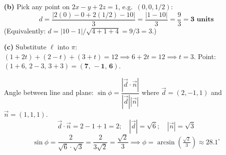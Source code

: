 \documentclass[addpoints]{exam}
\begin{document}
\begin{questions}
\begin{solution}[10cm]
\textbf{(b)} Pick any point on $2x-y+2z=1$, e.g.\ $(0,0,1/2)$:
\[
d = \frac{|2(0)-0+2(1/2)-10|}{3} = \frac{|1-10|}{3} = \frac{9}{3} = \mathbf{3 \text{ units}}
\]
(Equivalently: $d = |10-1|/\sqrt{4+1+4} = 9/3 = 3$.)

\textbf{(c)} Substitute $\ell$ into $\pi$:
$(1+2t)+(2-t)+(3+t) = 12 \implies 6+2t=12 \implies t=3$.
Point: $(1+6,\,2-3,\,3+3) = \mathbf{(7,\,-1,\,6)}$.

Angle between line and plane: $\sin\phi = \dfrac{|\vec{d}\cdot\vec{n}|}{|\vec{d}||\vec{n}|}$
where $\vec{d}=(2,-1,1)$ and $\vec{n}=(1,1,1)$.
\[
\vec{d}\cdot\vec{n} = 2-1+1 = 2;\quad |\vec{d}|=\sqrt{6};\quad |\vec{n}|=\sqrt{3}
\]
\[
\sin\phi = \frac{2}{\sqrt{6}\cdot\sqrt{3}} = \frac{2}{3\sqrt{2}} = \frac{\sqrt{2}}{3}
\implies \phi = \arcsin\!\left(\tfrac{\sqrt{2}}{3}\right) \approx \mathbf{28.1^\circ}
\]
\end{solution}

\end{questions}
\end{document}
